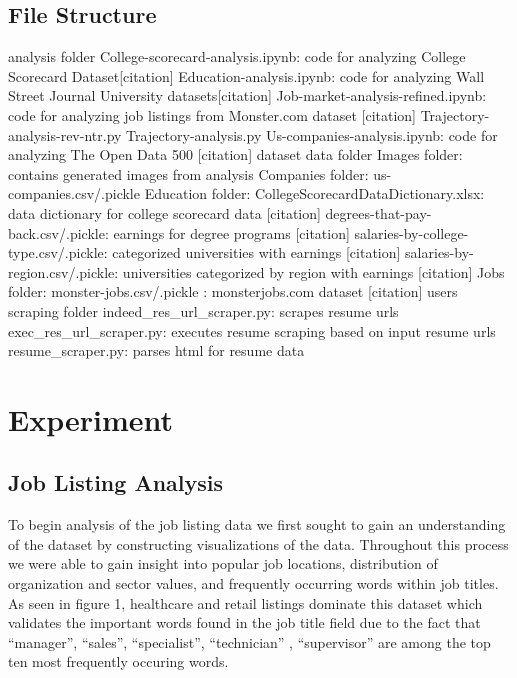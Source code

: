 \subsection{File Structure}
analysis folder
College-scorecard-analysis.ipynb: code for analyzing College Scorecard Dataset[citation]
Education-analysis.ipynb: code for analyzing Wall Street Journal University datasets[citation]
Job-market-analysis-refined.ipynb: code for analyzing job listings from Monster.com dataset [citation]
Trajectory-analysis-rev-ntr.py
Trajectory-analysis.py
Us-companies-analysis.ipynb: code for analyzing The Open Data 500 [citation] dataset
data folder
Images folder: contains generated images from analysis
Companies folder: 
us-companies.csv/.pickle
Education folder:
CollegeScorecardDataDictionary.xlsx: data dictionary for college scorecard data [citation]
degrees-that-pay-back.csv/.pickle: earnings for degree programs [citation]
salaries-by-college-type.csv/.pickle: categorized universities with earnings [citation]
salaries-by-region.csv/.pickle: universities categorized by region with earnings [citation]
Jobs folder:
monster-jobs.csv/.pickle : monsterjobs.com dataset [citation]
users
scraping folder
indeed\_res\_url\_scraper.py: scrapes resume urls
exec\_res\_url\_scraper.py: executes resume scraping based on input resume urls
resume\_scraper.py: parses html for resume data

\section{Experiment}
\subsection{Job Listing Analysis}
To begin analysis of the job listing data we first sought to gain an understanding of the dataset by constructing visualizations of the data. Throughout this process we were able to gain insight into popular job locations, distribution of organization and sector values, and frequently occurring words within job titles.  As seen in figure 1, healthcare and retail listings dominate this dataset which validates the important words found in the job title field due to the fact that “manager”, “sales”, “specialist”, “technician” , “supervisor” are among the top ten most frequently occuring words. 

